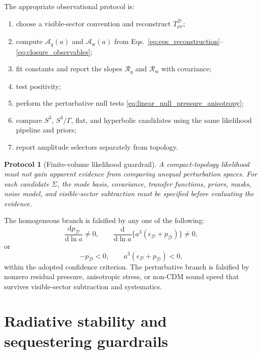 \documentclass[
  aps,
  prd,
  reprint,
  superscriptaddress,
  floatfix,
  nofootinbib,
  longbibliography
]{revtex4-2}
\theoremstyle{plain}
\newtheorem{protocol}[theorem]{Protocol}
\theoremstyle{definition}
\theoremstyle{remark}
\newcommand{\dd}{\mathrm d}
\newcommand{\D}{\mathcal D}
\newcommand{\w}{\mathrm w}
\newcommand{\Aq}{\mathcal A_q}
\newcommand{\Aw}{\mathcal A_{\mathrm w}}
\newcommand{\Rcl}{\mathcal R}
\newcommand{\eps}{\epsilon}
\begin{document}
The appropriate observational protocol is:
\begin{enumerate}
\item choose a visible-sector convention and reconstruct \(T^\D_{\mu\nu}\);
\item compute \(\Aq(a)\) and \(\Aw(a)\) from Eqs.~\eqref{eq:eps_reconstruction}--\eqref{eq:closure_observables};
\item fit constants and report the slopes \(\Rcl_q\) and \(\Rcl_{\w}\) with covariance;
\item test positivity;
\item perform the perturbative null tests \eqref{eq:linear_null_pressure_anisotropy};
\item compare \(S^3\), \(S^3/\Gamma\), flat, and hyperbolic candidates using the same likelihood pipeline and priors;
\item report amplitude selectors separately from topology.
\end{enumerate}

\begin{protocol}[Finite-volume likelihood guardrail]
A compact-topology likelihood must not gain apparent evidence from comparing unequal perturbation spaces.  For each candidate \(\Sigma\), the mode basis, covariance, transfer functions, priors, masks, noise model, and visible-sector subtraction must be specified before evaluating the evidence.
\end{protocol}

The homogeneous branch is falsified by any one of the following:
\begin{equation}
\frac{\dd p_\D}{\dd\ln a}\ne0,\qquad
\frac{\dd}{\dd\ln a}\{a^3(\eps_\D+p_\D)\}\ne0,
\label{eq:background_falsifiers}
\end{equation}
or
\begin{equation}
-p_\D<0,\qquad a^3(\eps_\D+p_\D)<0,
\label{eq:positivity_falsifiers}
\end{equation}
within the adopted confidence criterion.  The perturbative branch is falsified by nonzero residual pressure, anisotropic stress, or non-CDM sound speed that survives visible-sector subtraction and systematics.

\section{Radiative stability and sequestering guardrails}
\end{document}
